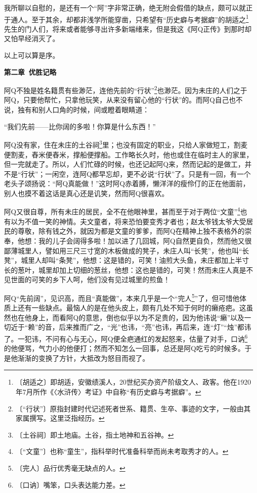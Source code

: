 \documentclass[12pt,UTF-8,openany]{ctexbook}
\begin{document}
\begin{normalsize}
    我所聊以自慰的，是还有一个“阿”字非常正确，绝无附会假借的缺点，颇可以就正于通人。至于其余，却都非浅学所能穿凿，只希望有“历史癖与考据癖”的胡适之\footnote{〔胡适之〕即胡适，安徽绩溪人，20世纪买办资产阶级文人、政客。他在1920年7月所作《〈水浒传〉考证》中自称“有历史癖与考据癖”。}先生的门人们，将来或者能够寻出许多新端绪来，但是我这《阿Q正传》到那时却又怕早经消灭了。
    
    以上可以算是序。
    
    \begin{center}\textbf{第二章~优胜记略}\end{center}
    
    阿Q不独是姓名籍贯有些渺茫，连他先前的“行状”\footnote{〔“行状”〕原指封建时代记述死者世系、籍贯、生卒、事迹的文字，一般由其家属撰写。这里泛指经历。}也渺茫。因为未庄的人们之于阿Q，只要他帮忙，只拿他玩笑，从来没有留心他的“行状”的。而阿Q自己也不说，独有和别人口角的时候，间或瞪着眼睛道：
    
    “我们先前——比你阔的多啦！你算是什么东西！”
    
    阿Q没有家，住在未庄的土谷祠\footnote{〔土谷祠〕即土地庙。土谷，指土地神和五谷神。}里；也没有固定的职业，只给人家做短工，割麦便割麦，舂米便舂米，撑船便撑船。工作略长久时，他也或住在临时主人的家里，但一完就走了。所以，人们忙碌的时候，也还记起阿Q来，然而记起的是做工，并不是“行状”；一闲空，连阿Q都早忘却，更不必说“行状”了。只是有一回，有一个老头子颂扬说：“阿Q真能做！”这时阿Q赤着膊，懒洋洋的瘦伶仃的正在他面前，别人也摸不着这话是真心还是讥笑，然而阿Q很喜欢。
    
    阿Q又很自尊，所有未庄的居民，全不在他眼神里，甚而至于对于两位“文童”\footnote{〔“文童”〕也称“童生”，指科举时代准备科举而尚未考取秀才的人。}也有以为不值一笑的神情。夫文童者，将来恐怕要变秀才者也；赵太爷钱太爷大受居民的尊敬，除有钱之外，就因为都是文童的爹爹，而阿Q在精神上独不表格外的崇奉，他想：我的儿子会阔得多啦！加以进了几回城，阿Q自然更自负，然而他又很鄙薄城里人，譬如用三尺三寸宽的木板做成的凳子，未庄人叫“长凳”，他也叫“长凳”，城里人却叫“条凳”，他想：这是错的，可笑！油煎大头鱼，未庄都加上半寸长的葱叶，城里却加上切细的葱丝，他想：这也是错的，可笑！然而未庄人真是不见世面的可笑的乡下人呵，他们没有见过城里的煎鱼！
    
    阿Q“先前阔”，见识高，而且“真能做”，本来几乎是一个“完人\footnote{〔完人〕品行优秀毫无缺点的人。}”了，但可惜他体质上还有一些缺点。最恼人的是在他头皮上，颇有几处不知于何时的癞疮疤。这虽然也在他身上，而看阿Q的意思，倒也似乎以为不足贵的，因为他讳说“癞”以及一切近于“赖”的音，后来推而广之，“光”也讳，“亮”也讳，再后来，连“灯”“烛”都讳了。一犯讳，不问有心与无心，阿Q便全疤通红的发起怒来，估量了对手，口讷\footnote{〔口讷〕嘴笨，口头表达能力差。}的他便骂，气力小的他便打；然而不知怎么一回事，总还是阿Q吃亏的时候多。于是他渐渐的变换了方针，大抵改为怒目而视了。
    

\end{normalsize}
\end{document}
